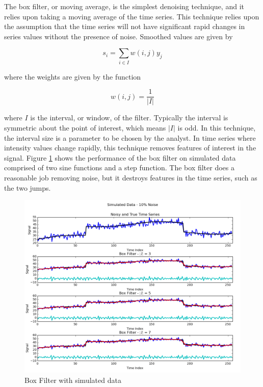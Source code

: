 \documentclass[11pt]{article}
\theoremstyle{definition}
\begin{document}
The box filter, or moving average, is the simplest denoising technique, and it relies upon taking a moving average of the time series. This technique relies upon the assumption that the time series will not have significant rapid changes in series values without the presence of noise. Smoothed values are given by

\begin{displaymath}
s_i = \sum _{i \in I} w \left(i, j \right) y_j
\end{displaymath}

\noindent
where the weights are given by the function

\begin{displaymath}
w\left(i, j\right) = \frac{1}{\lvert I \rvert}
\end{displaymath}

\noindent
where $I$ is the interval, or window, of the filter. Typically the interval is symmetric about the point of interest, which means $\lvert I \rvert$ is odd. In this technique, the interval size is a parameter to be chosen by the analyst. In time series where intensity values change rapidly, this technique removes features of interest in the signal. Figure \ref{boxcompare} shows the performance of the box filter on simulated data comprised of two sine functions and a step function. The box filter does a reasonable job removing noise, but it destroys features in the time series, such as the two jumps.\\

\begin{figure}
\centering
\includegraphics[width = 0.75 \textwidth]{BoxCompare.png}
\caption{Box Filter with simulated data}
\label{boxcompare}
\end{figure}
\end{document}
